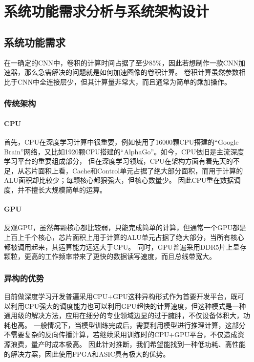 \chapter{系统功能需求分析与系统架构设计}

\section{系统功能需求}
在一确定的CNN中，卷积的计算时间占据了至少85\%\cite{chen2017eyeriss}，因此若想制作一款CNN加速器，那么急需解决的问题就是如何加速图像的卷积计算。
卷积计算虽然参数相比于CNN中全连接层少，但其计算量非常大，而且通常为简单的乘加操作。
    \subsection{传统架构}
        \subsubsection{CPU}
        首先，CPU在深度学习计算中很重要，例如使用了16000颗CPU搭建的“Google Brain”网络，又比如1920颗CPU搭建的“AlphaGo”。如今，CPU依旧是主流深度学习平台的重要组成部分，
        但在深度学习领域，CPU在架构方面有着先天的不足，从芯片面积上看，Cache和Control单元占据了绝大部分面积，而用于计算的ALU面积却比较少；每颗核心都狠强大，但核心数量少。
        因此CPU重在数据调度，并不擅长大规模简单的运算。
        \subsubsection{GPU}
        反观GPU，虽然每颗核心都比较弱，只能完成简单的计算，但通常一个GPU都是上百上千个核心，芯片面积上用于计算的ALU单元占据了绝大部分，当所有核心都被调用起来，其运算能力远远大于CPU。
        同时，GPU普遍采用DDR5片上显存颗粒，更高的工作频率带来了更快的数据读写速度，而且总线带宽大。
    \subsection{异构的优势}
        目前做深度学习开发普遍采用CPU+GPU这种异构形式作为首要开发平台，既可以利用CPU强大的调度能力也可以利用GPU超快的计算速度，但这种模式是一种通用级的解决方法，应用在细分的专业领域边显的过于臃肿，不仅设备体积大，功耗也高。
        一般情况下，当模型训练完成后，需要利用模型进行推理计算，这部分不需要复杂的反向传播计算，若继续采用训练时的CPU+GPU平台，不仅造成资源浪费，量产时成本极高。
        因此针对推断，我们希望能找到一种低功耗、高性能的解决方案，因此使用FPGA和ASIC具有极大的优势。

